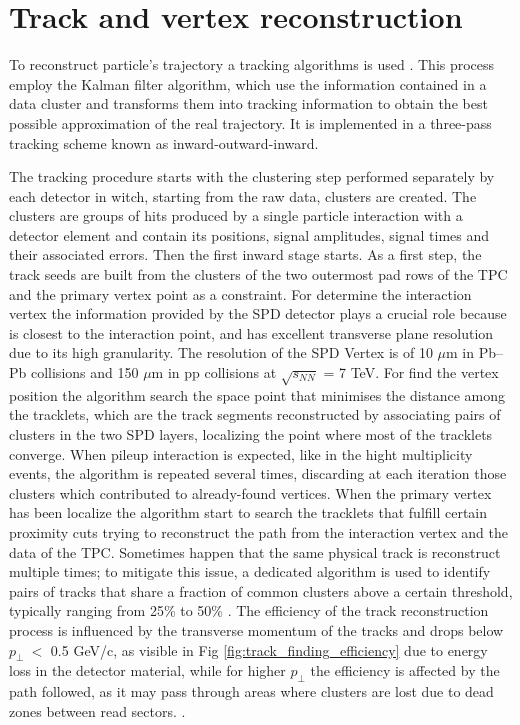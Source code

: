 \documentclass[12pt,a4paper]{book}
\begin{document}
\section{Track and vertex reconstruction} \label{cap:5.3}

To reconstruct particle's trajectory a tracking algorithms is used \cite{Cheng:2908766}.  This process employ the Kalman filter algorithm, which use the information contained in a data cluster and transforms them into tracking information to obtain the best possible approximation of the real trajectory. It is implemented in a three-pass tracking scheme known as inward-outward-inward. 

The tracking procedure starts with the clustering step performed separately by each detector in witch, starting from the raw data, clusters are created. The clusters are groups of hits produced by a single particle interaction with a detector element and contain its positions, signal amplitudes, signal times and their associated errors. Then the first inward stage starts. As a first step, the track seeds are built from the clusters of the two outermost pad rows of the TPC and the primary vertex point as a constraint. For determine the interaction vertex the information provided by the SPD detector plays a crucial role because is closest to the interaction point, and has excellent transverse plane resolution due to its high granularity. The resolution of the SPD Vertex is of 10 $\mu$m in Pb–Pb collisions and 150 $\mu$m in pp collisions at $\sqrt{s_{NN}}$ = 7 TeV. For find the vertex position the algorithm search the space point that minimises the distance among the tracklets, which are the track segments reconstructed by associating pairs of clusters in the two SPD layers, localizing the point where most of the tracklets converge. When pileup interaction is expected, like in the hight multiplicity events,  the algorithm is repeated several times, discarding at each iteration those clusters which contributed to already-found vertices. When the primary vertex has been localize the algorithm start to search the tracklets that fulfill certain proximity cuts trying to reconstruct the path from the interaction vertex and the data of the TPC. Sometimes happen that the same physical track is reconstruct multiple times; to mitigate this issue, a dedicated algorithm is used to identify pairs of tracks that share a fraction of common clusters above a certain threshold, typically ranging from 25\% to 50\% . 
The efficiency of the track reconstruction process is influenced by the transverse momentum of the tracks and drops below $p_\perp \ <$ 0.5 GeV/c, as visible in Fig \ref{fig:track_finding_efficiency} due to energy loss in the detector material, while for higher $p_\perp$ the efficiency is affected by the path followed, as it may pass through areas where clusters are lost due to dead zones between read sectors. \cite{Padhan:2924203}.
\end{document}
